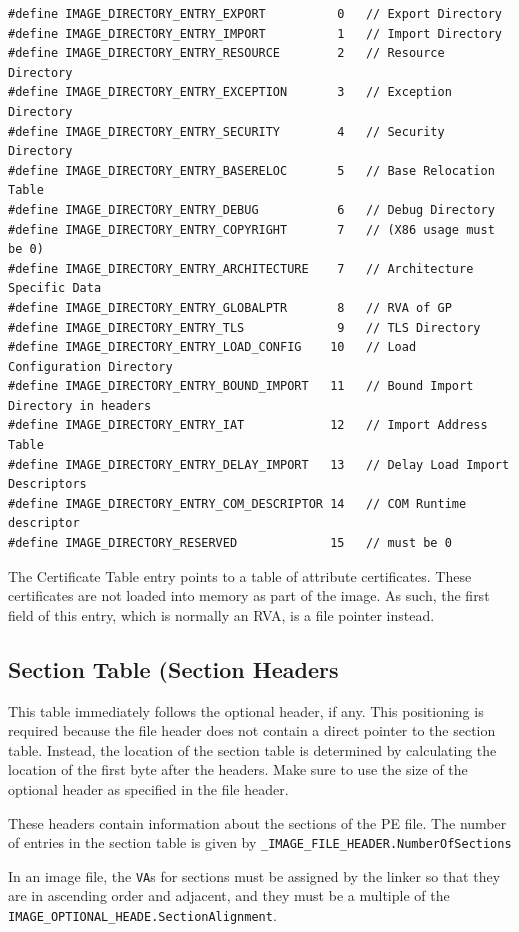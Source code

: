 \begin{verbatim}
#define IMAGE_DIRECTORY_ENTRY_EXPORT          0   // Export Directory
#define IMAGE_DIRECTORY_ENTRY_IMPORT          1   // Import Directory
#define IMAGE_DIRECTORY_ENTRY_RESOURCE        2   // Resource Directory
#define IMAGE_DIRECTORY_ENTRY_EXCEPTION       3   // Exception Directory
#define IMAGE_DIRECTORY_ENTRY_SECURITY        4   // Security Directory
#define IMAGE_DIRECTORY_ENTRY_BASERELOC       5   // Base Relocation Table
#define IMAGE_DIRECTORY_ENTRY_DEBUG           6   // Debug Directory
#define IMAGE_DIRECTORY_ENTRY_COPYRIGHT       7   // (X86 usage must be 0)
#define IMAGE_DIRECTORY_ENTRY_ARCHITECTURE    7   // Architecture Specific Data
#define IMAGE_DIRECTORY_ENTRY_GLOBALPTR       8   // RVA of GP
#define IMAGE_DIRECTORY_ENTRY_TLS             9   // TLS Directory
#define IMAGE_DIRECTORY_ENTRY_LOAD_CONFIG    10   // Load Configuration Directory
#define IMAGE_DIRECTORY_ENTRY_BOUND_IMPORT   11   // Bound Import Directory in headers
#define IMAGE_DIRECTORY_ENTRY_IAT            12   // Import Address Table
#define IMAGE_DIRECTORY_ENTRY_DELAY_IMPORT   13   // Delay Load Import Descriptors
#define IMAGE_DIRECTORY_ENTRY_COM_DESCRIPTOR 14   // COM Runtime descriptor
#define IMAGE_DIRECTORY_RESERVED             15   // must be 0
\end{verbatim}

The Certificate Table entry points to a table of attribute certificates. These certificates are not loaded into memory as part of the image. As such, the first field of this entry, which is normally an RVA, is a file pointer instead.

\subsection{Section Table (Section Headers}

This table immediately follows the optional header, if any. This positioning is required because the file header does not contain a direct pointer to the section table. Instead, the location of the section table is determined by calculating the location of the first byte after the headers. Make sure to use the size of the optional header as specified in the file header.

These headers contain information about the sections of the PE file. The number of entries in the section table is given by \verb+_IMAGE_FILE_HEADER.NumberOfSections+

In an image file, the \verb+VA+s for sections must be assigned by the linker so that they are in ascending order and adjacent, and they must be a multiple of the \verb+IMAGE_OPTIONAL_HEADE.SectionAlignment+.

